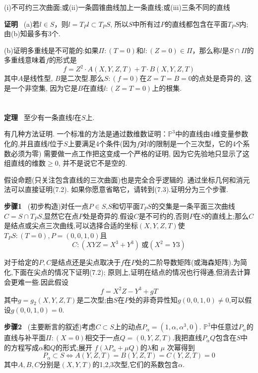 \documentclass[UTF8]{book}
\begin{document}
	(i)不可约三次曲面;或(ii)一条圆锥曲线加上一条直线;或(iii)三条不同的直线	
	
	\textbf{证明} \ (a)若$l\in S$，则$l=T_{P}l\subset T_{P}S$, 所以$ S $中所有过$ P $的直线都包含在平面$T_{P}S$内;由(b)知最多有3个.
	
	(b)证明多重线是不可能的:如果$\Pi:(T = 0)$和$l:(Z = 0)\in \Pi$，那么称$ l $是$S\cap \Pi$的多重线意味着$ f $的形式是
	\begin{equation*}
	f=Z^{2}\cdot A(X,Y,Z,T)+T\cdot B(X,Y,Z,T)
	\end{equation*}
	其中$ A $是线性型, $ B $是二次型.那么$ S:(f=0) $在$ Z=T=B=0 $的点处是奇异的, 这是一个非空集, 因为它是$ B $在直线$ l:(Z = T = 0) $上的根集.
	
	\section{}
	\textbf{定理} \ 至少有一条直线$l$在$ S $上.
	
	有几种方法证明. 一个标准的方法是通过数维数证明：$\mathbb{P}^{3}$中的直线由4维变量参数化的,并且直线$ l $位于$ S $上要满足4个条件(因为$ f $对$ l $的限制是一个三次型，它的4个系数必须为零)
	需要做一点工作把这变成一个严格的证明, 因为它先验地只显示了这组直线的维数$\geq 0$, 并不是说它不是空的.
	
	假设命题(只关注包含直线的三次曲面)也是完全合乎逻辑的. 通过坐标几何和消元法可以直接证明(7.2). 如果你愿意省略它，请转到(7.3).证明分为三个步骤.
	
	\textbf{步骤1} \ (初步构造)对任一点$P\in S$,$ S $和切平面$T_{P}S$的交集是一条平面三次曲线$C=S\cap T_{P}S$,显然它在点$ P $处是奇异的.假设$ C $是不可约的,否则$ P $在$ S $的直线上;那么$ C $是结点或尖点三次曲线,可以选择合适的坐标$ (X,Y,Z,T) $使
	$T_{P}S:(T=0),P=(0,0,1,0)$且
	\begin{equation*}
	C:(XYZ=X^{3}+Y^{3}) \ \text{或} (X^{2}=Y{3})
	\end{equation*}
	
	对于给定的$ P, C $是结点还是尖点取决于$ f $在$ P $处的二阶导数矩阵(或海森矩阵).为简化,下面在尖点的情况下证明(7.2);
	原则上,证明在结点的情况也行得通,但消去计算会更难一些.因此假设
	\begin{equation*}
	f=X^{2}Z-Y^{3}+gT
	\end{equation*}
	其中$g=g_{2}(X,Y,Z,T)$是二次型;由$ S $在$ P $处的非奇异性知$g(0,0,1,0)\neq 0$,可以假设$g(0,0,1,0)= 0$.
	
	\textbf{步骤2} \ (主要断言的叙述)考虑$C\subset S$上的动点$P_{\alpha}=(1,\alpha,\alpha^{3},0)$.  $\mathbb{P} ^{3}$中任意过$P_{\alpha}$的直线与补平面$\Pi:(X=0)$相交于一点$ Q=(0,Y,Z,T) $.我把直线$P_{\alpha}Q$包含在$ S $中的方程写成$\alpha$和$ Q $的形式;展开
	$f(\lambda P_{\alpha}+\mu Q)$的$\lambda $和 $\mu$ 次幂得到
	\begin{equation*}
	P_{\alpha}\subset S \Leftrightarrow A(Y,Z,T)=B(Y,Z,T)=C(Y,Z,T)=0
	\end{equation*}
	其中$ A,B,C $分别是$ (X,Y,T) $的1,2,3次型,它们的系数包含$\alpha$.
	
\end{document}
